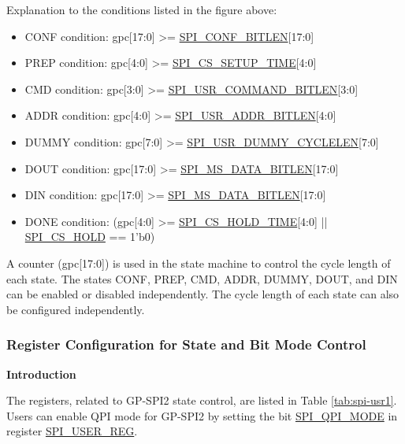 \documentclass[main\_\_EN.tex]{subfiles}
\begin{document}
Explanation to the conditions listed in the figure above:
\begin{itemize}
    \item CONF condition: gpc[17:0] >= \hyperref[fielddesc:SPICONFBITLEN]{SPI\_CONF\_BITLEN}[17:0]
    \item PREP condition: gpc[4:0] >= \hyperref[fielddesc:SPICSSETUPTIME]{SPI\_CS\_SETUP\_TIME}[4:0]
    \item CMD condition: gpc[3:0] >= \hyperref[fielddesc:SPIUSRCOMMANDBITLEN]{SPI\_USR\_COMMAND\_BITLEN}[3:0]
    \item ADDR condition: gpc[4:0] >= \hyperref[fielddesc:SPIUSRADDRBITLEN]{SPI\_USR\_ADDR\_BITLEN}[4:0]
    \item DUMMY condition: gpc[7:0] >= \hyperref[fielddesc:SPIUSRDUMMYCYCLELEN]{SPI\_USR\_DUMMY\_CYCLELEN}[7:0]
    \item DOUT condition: gpc[17:0] >= \hyperref[fielddesc:SPIMSDATABITLEN]{SPI\_MS\_DATA\_BITLEN}[17:0]
    \item DIN condition: gpc[17:0] >= \hyperref[fielddesc:SPIMSDATABITLEN]{SPI\_MS\_DATA\_BITLEN}[17:0]
    
    \item DONE condition: (gpc[4:0] >= \hyperref[fielddesc:SPICSHOLDTIME]{SPI\_CS\_HOLD\_TIME}[4:0] || \hyperref[fielddesc:SPICSHOLD]{SPI\_CS\_HOLD} == 1'b0)
    
\end{itemize}





A counter (gpc[17:0]) is used in the state machine to control the cycle length of each state. The states CONF, PREP, CMD, ADDR, DUMMY, DOUT, and DIN can be enabled or disabled independently. The cycle length of each state can also be configured independently. 

\subsubsection{Register Configuration for State and Bit Mode Control} \label{sec:gp-spi2-state-and-register-configuration}

\textbf{Introduction}

The registers, related to GP-SPI2 state control, are listed in Table \ref{tab:spi-usr1}. Users can enable QPI mode for GP-SPI2 by setting the bit \hyperref[fielddesc:SPIQPIMODE]{SPI\_QPI\_MODE} in register \hyperref[regdesc:SPIUSERREG]{SPI\_USER\_REG}. 
\end{document}
